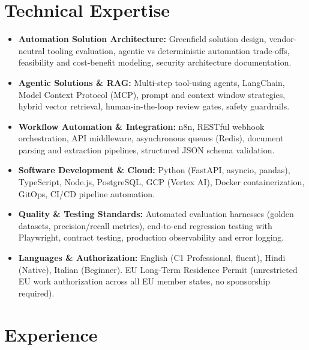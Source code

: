 \documentclass[10pt,a4paper]{article}
\begin{document}
\section{Technical Expertise}
\begin{itemize}
  \item \textbf{Automation Solution Architecture:} Greenfield solution design, vendor-neutral tooling evaluation, agentic vs deterministic automation trade-offs, feasibility and cost-benefit modeling, security architecture documentation.
  \item \textbf{Agentic Solutions \& RAG:} Multi-step tool-using agents, LangChain, Model Context Protocol (MCP), prompt and context window strategies, hybrid vector retrieval, human-in-the-loop review gates, safety guardrails.
  \item \textbf{Workflow Automation \& Integration:} n8n, RESTful webhook orchestration, API middleware, asynchronous queues (Redis), document parsing and extraction pipelines, structured JSON schema validation.
  \item \textbf{Software Development \& Cloud:} Python (FastAPI, asyncio, pandas), TypeScript, Node.js, PostgreSQL, GCP (Vertex AI), Docker containerization, GitOps, CI/CD pipeline automation.
  \item \textbf{Quality \& Testing Standards:} Automated evaluation harnesses (golden datasets, precision/recall metrics), end-to-end regression testing with Playwright, contract testing, production observability and error logging.
  \item \textbf{Languages \& Authorization:} English (C1 Professional, fluent), Hindi (Native), Italian (Beginner). EU Long-Term Residence Permit (unrestricted EU work authorization across all EU member states, no sponsorship required).
\end{itemize}

\section{Experience}
\end{document}
